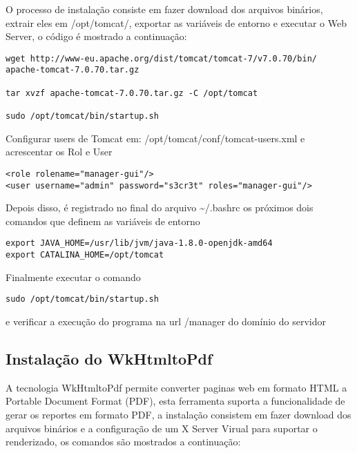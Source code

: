 O processo de instalação consiste em fazer download dos arquivos binários,
extrair eles em \foreignlanguage{english}{/opt/tomcat/}, exportar
as variáveis de entorno e executar o \foreignlanguage{english}{Web
Server}, o código é mostrado a continuação:

\begin{lstlisting}
wget http://www-eu.apache.org/dist/tomcat/tomcat-7/v7.0.70/bin/
apache-tomcat-7.0.70.tar.gz

tar xvzf apache-tomcat-7.0.70.tar.gz -C /opt/tomcat

sudo /opt/tomcat/bin/startup.sh
\end{lstlisting}
Configurar \foreignlanguage{english}{users} de \foreignlanguage{english}{Tomcat}
em: \foreignlanguage{english}{/opt/tomcat/conf/tomcat-users.xml }e
acrescentar os Rol e \foreignlanguage{english}{User}

\begin{lstlisting}
<role rolename="manager-gui"/> 
<user username="admin" password="s3cr3t" roles="manager-gui"/>
\end{lstlisting}
Depois disso, é registrado no final do arquivo \textasciitilde{}/.bashrc
os próximos dois comandos que definem as variáveis de entorno

\begin{lstlisting}
export JAVA_HOME=/usr/lib/jvm/java-1.8.0-openjdk-amd64 
export CATALINA_HOME=/opt/tomcat
\end{lstlisting}
Finalmente executar o comando 

\begin{lstlisting}
sudo /opt/tomcat/bin/startup.sh
\end{lstlisting}
e verificar a execução do programa na url /manager do domínio do servidor

\subsection*{Instalação do \foreignlanguage{english}{WkHtmltoPdf}}

A tecnologia \foreignlanguage{english}{WkHtmltoPdf} permite converter
paginas web em formato \foreignlanguage{english}{HTML} a \foreignlanguage{english}{Portable
Document Format (PDF}),
esta ferramenta suporta a funcionalidade de gerar os reportes em formato
PDF, a instalação consistem em fazer download dos arquivos binários
e a configuração de um X Server Virual para suportar o renderizado,
os comandos são mostrados a continuação:

